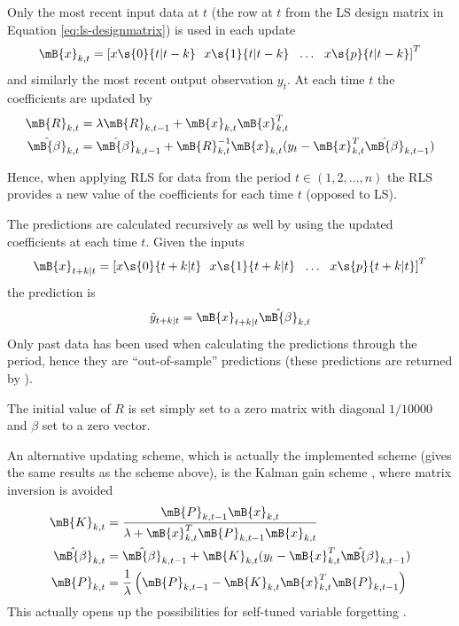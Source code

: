 \begin{appendix}
Only the most recent input data at $t$ (the row at $t$ from the LS design
matrix in Equation \eqref{eq:ls-designmatrix}) is used in each update
\begin{align}
  \mB{x}_{k,t} = \left[ x\s{0}{t|t-k} ~~ x\s{1}{t|t-k} ~~ \dots ~~
    x\s{p}{t|t-k} \right]^T
\end{align}  
and similarly the most recent output observation $y_{t}$. At each time $t$ the coefficients are updated by
\begin{align}
  \mB{R}_{k,t} &= \lambda \mB{R}_{k,t-1} + \mB{x}_{k,t} \mB{x}^T_{k,t}\\
  \hat{\mB{\beta}}_{k,t} &= \hat{\mB{\beta}}_{k,t-1} + \mB{R}^{-1}_{k,t}
  \mB{x}_{k,t} (y_t - \mB{x}^T_{k,t} \hat{\mB{\beta}}_{k,t-1})
\end{align}

Hence, when applying RLS for data from the period $t \in (1,2,\dots,n)$ the
RLS provides a new value of the coefficients for each time $t$ (opposed to LS).

The predictions are calculated recursively as well by using the updated
coefficients at each time $t$. Given the inputs
\begin{align}
  \mB{x}_{t+k|t} = \left[ x\s{0}{t+k|t} ~~ x\s{1}{t+k|t} ~~ \dots ~~
    x\s{p}{t+k|t} \right]^T
\end{align}
the prediction is
\begin{align}
  \hat{y}_{t+k|t} = \mB{x}_{t+k|t} \hat{\mB{\beta}}_{k,t}
\end{align}
Only past data has been used when calculating the predictions through the
period, hence they are ``out-of-sample'' predictions (these predictions are returned by ).

The initial value of $R$ is set simply set to a zero matrix with diagonal
$1/10000$ and $\beta$ set to a zero vector.

An alternative updating scheme, which is actually the implemented scheme (gives
the same results as the scheme above), is the Kalman gain scheme
\citep{sayed1994state}, where matrix inversion is avoided
\begin{align}
  \mB{K}_{k,t} &= \frac{\mB{P}_{k,t-1} \mB{x}_{k,t}}{ \lambda + \mB{x}^T_{k,t}
    \mB{P}_{k,t-1} \mB{x}_{k,t}}\\
  \hat{\mB{\beta}}_{k,t} &= \hat{\mB{\beta}}_{k,t-1} + \mB{K}_{k,t} (y_t -
  \mB{x}^T_{k,t} \hat{\mB{\beta}}_{k,t-1})\\
  \mB{P}_{k,t} &= \frac{1}{\lambda} \left( \mB{P}_{k,t-1} - \mB{K}_{k,t}
  \mB{x}^T_{k,t} \mB{P}_{k,t-1} \right)
\end{align}
This actually opens up the possibilities for self-tuned variable forgetting
\citep{shah1991recursive}.


\end{appendix}



